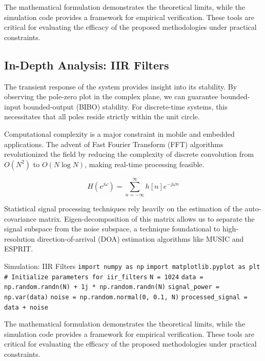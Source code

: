 \vspace{0.5cm}
The mathematical formulation demonstrates the theoretical limits, while the simulation code provides a framework for empirical verification. These tools are critical for evaluating the efficacy of the proposed methodologies under practical constraints.


\subsection{In-Depth Analysis: IIR Filters}
The transient response of the system provides insight into its stability. By observing the pole-zero plot in the complex plane, we can guarantee bounded-input bounded-output (BIBO) stability. For discrete-time systems, this necessitates that all poles reside strictly within the unit circle.

Computational complexity is a major constraint in mobile and embedded applications. The advent of Fast Fourier Transform (FFT) algorithms revolutionized the field by reducing the complexity of discrete convolution from $O(N^2)$ to $O(N \log N)$, making real-time processing feasible.

\begin{equation}
    H(e^{j\omega}) = \sum_{n=-\infty}^{\infty} h[n] e^{-j\omega n}
\end{equation}

Statistical signal processing techniques rely heavily on the estimation of the auto-covariance matrix. Eigen-decomposition of this matrix allows us to separate the signal subspace from the noise subspace, a technique foundational to high-resolution direction-of-arrival (DOA) estimation algorithms like MUSIC and ESPRIT.

\begin{pythonbox}{Simulation: IIR Filters}
\texttt{import numpy as np}
\texttt{import matplotlib.pyplot as plt}
\texttt{}
\texttt{\# Initialize parameters for iir\_filters}
\texttt{N = 1024}
\texttt{data = np.random.randn(N) + 1j * np.random.randn(N)}
\texttt{signal\_power = np.var(data)}
\texttt{noise = np.random.normal(0, 0.1, N)}
\texttt{processed\_signal = data + noise}
\end{pythonbox}

\vspace{0.5cm}
The mathematical formulation demonstrates the theoretical limits, while the simulation code provides a framework for empirical verification. These tools are critical for evaluating the efficacy of the proposed methodologies under practical constraints.


